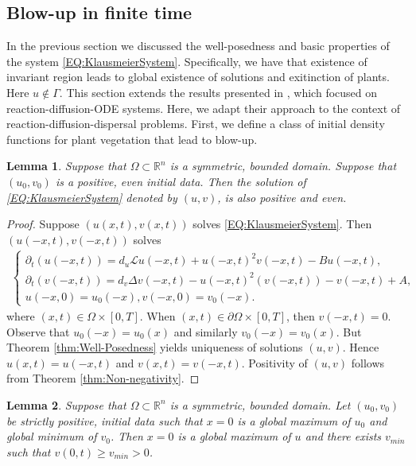 \documentclass[12pt, a4paper]{article}
\theoremstyle{break}
\theoremstyle{break}
\theoremstyle{break}
\theoremstyle{break}
\theoremstyle{break}
\newtheorem{lem}{Lemma}[section]
\theoremstyle{break}
\theoremstyle{break}
\begin{document}
\subsection{Blow-up in finite time}

In the previous section we discussed the well-posedness and basic properties of the system \eqref{EQ:KlausmeierSystem}. Specifically, we have that existence of invariant region leads to global existence of solutions and exitinction of plants. Here $u \notin \Gamma$. This section extends the results presented in \cite{ZenekArticle}, which focused on reaction-diffusion-ODE systems. Here, we adapt their approach to the context of reaction-diffusion-dispersal problems. First, we define a class of initial density functions for plant vegetation that lead to blow-up.

\begin{lem}
    Suppose that $\Omega \subset \mathbb{R}^n$ is a symmetric, bounded domain. Suppose that $(u_0, v_0)$ is a positive, even initial data. Then the solution of \eqref{EQ:KlausmeierSystem} denoted by $(u, v)$, is also positive and even.
\end{lem}
\begin{proof}
    Suppose $(u(x,t), v(x,t))$ solves \eqref{EQ:KlausmeierSystem}. Then $(u(-x,t), v(-x,t))$ solves
    \begin{align*}
        \begin{cases}
            \partial_t ( u(-x, t)) = d_u\mathcal{L} u(-x, t) + u(-x, t)^2 v(-x, t) - Bu(-x,t), \\
            \partial_t ( v(-x, t)) = d_v\Delta v(-x, t) - u(-x, t)^2 (v(-x, t)) - v(-x, t) + A, \\
            u(-x, 0) = u_0(-x), v(-x, 0) = v_0(-x).
        \end{cases}
    \end{align*}
    where $(x, t) \in \Omega \times [0, T]$. When $(x, t) \in \partial \Omega \times [0, T]$, then $v(-x, t) = 0$. Observe that $u_0(-x) = u_0(x)$ and similarly $v_0(-x) = v_0(x)$. But Theorem \ref{thm:Well-Posedness} yields uniqueness of solutions $(u, v)$. Hence $u(x, t) = u(-x, t)$ and $v(x, t) = v(-x, t)$. Positivity of $(u, v)$ follows from Theorem \ref{thm:Non-negativity}.
\end{proof}
\begin{lem}
    Suppose that $\Omega \subset \mathbb{R}^n$ is a symmetric, bounded domain. Let $(u_0, v_0)$ be strictly positive, initial data such that $x = 0$ is a global maximum of $u_0$ and global minimum of $v_0$. Then $x = 0$ is a global maximum of $u$ and there exists $v_{min}$ such that $v(0, t) \geq v_{min} > 0$.
\end{lem}
\end{document}
